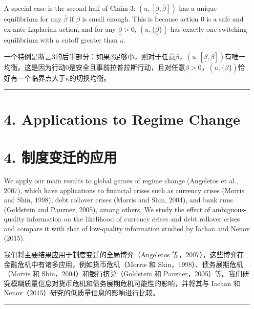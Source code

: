 \documentclass[12pt,a4paper]{article}
\newenvironment{original}
  {\par\medskip\noindent\color{black}\ignorespaces}
  {\par\medskip}
\newenvironment{translation}
  {\par\noindent\color{darkblue}\ignorespaces}
  {\par\medskip\noindent\hrule\par\medskip}
\theoremstyle{definition}
\theoremstyle{remark}
\begin{document}
\begin{original}
A special case is the second half of Claim 3: $(u, [\underline{\beta}, \overline{\beta}])$ has a unique equilibrium for any $\overline{\beta}$ if $\underline{\beta}$ is small enough. This is because action 0 is a safe and ex-ante Laplacian action, and for any $\underline{\beta} > 0$, $(u, \{\underline{\beta}\})$ has exactly one switching equilibrium with a cutoff greater than $\kappa$.
\end{original}
\begin{translation}
一个特例是断言3的后半部分：如果$\underline{\beta}$足够小，则对于任意$\overline{\beta}$，$(u, [\underline{\beta}, \overline{\beta}])$有唯一均衡。这是因为行动0是安全且事前拉普拉斯行动，且对任意$\underline{\beta} > 0$，$(u, \{\underline{\beta}\})$恰好有一个临界点大于$\kappa$的切换均衡。
\end{translation}

\section{4. Applications to Regime Change}
\section*{\color{darkblue}4. 制度变迁的应用}

\begin{original}
We apply our main results to global games of regime change (Angeletos et al., 2007), which have applications to financial crises such as currency crises (Morris and Shin, 1998), debt rollover crises (Morris and Shin, 2004), and bank runs (Goldstein and Pauzner, 2005), among others. We study the effect of ambiguous-quality information on the likelihood of currency crises and debt rollover crises and compare it with that of low-quality information studied by Iachan and Nenov (2015).
\end{original}
\begin{translation}
我们将主要结果应用于制度变迁的全局博弈（Angeletos 等，2007），这些博弈在金融危机中有诸多应用，例如货币危机（Morris 和 Shin，1998）、债务展期危机（Morris 和 Shin，2004）和银行挤兑（Goldstein 和 Pauzner，2005）等。我们研究模糊质量信息对货币危机和债务展期危机可能性的影响，并将其与 Iachan 和 Nenov（2015）研究的低质量信息的影响进行比较。
\end{translation}
\end{document}
